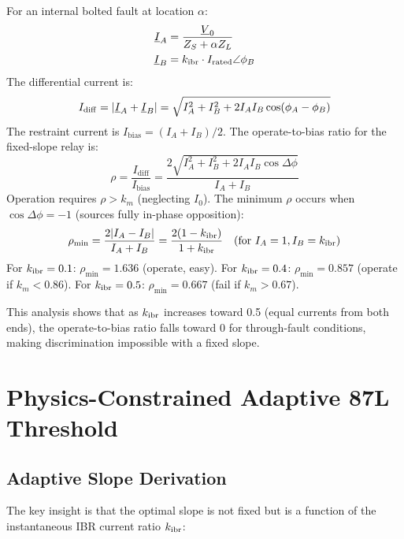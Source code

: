 For an internal bolted fault at location $\alpha$:
\begin{align}
  \underline{I}_A &= \frac{\underline{V}_0}{Z_S + \alpha Z_L}
  \label{eq:ch4_ia_fault} \\
  \underline{I}_B &= k_\mathrm{ibr} \cdot I_\mathrm{rated} \angle \phi_B
  \label{eq:ch4_ib_ibr}
\end{align}
The differential current is:
\begin{equation}
  I_\mathrm{diff} = |\underline{I}_A + \underline{I}_B|
    = \sqrt{I_A^2 + I_B^2 + 2I_A I_B \cos(\phi_A - \phi_B)}
  \label{eq:ch4_idiff_fault}
\end{equation}
The restraint current is $I_\mathrm{bias} = (I_A + I_B)/2$.
The operate-to-bias ratio for the fixed-slope relay is:
\begin{equation}
  \rho = \frac{I_\mathrm{diff}}{I_\mathrm{bias}} =
  \frac{2\sqrt{I_A^2 + I_B^2 + 2I_A I_B \cos\Delta\phi}}{I_A + I_B}
  \label{eq:ch4_rho}
\end{equation}
Operation requires $\rho > k_m$ (neglecting $I_0$). The minimum $\rho$
occurs when $\cos\Delta\phi = -1$ (sources fully in-phase opposition):
\begin{equation}
  \rho_\mathrm{min} = \frac{2|I_A - I_B|}{I_A + I_B}
  = \frac{2(1 - k_\mathrm{ibr})}{1 + k_\mathrm{ibr}} \quad (\text{for }I_A = 1, I_B = k_\mathrm{ibr})
  \label{eq:ch4_rho_min}
\end{equation}
For $k_\mathrm{ibr} = 0.1$: $\rho_\mathrm{min} = 1.636$ (operate, easy).
For $k_\mathrm{ibr} = 0.4$: $\rho_\mathrm{min} = 0.857$ (operate if $k_m < 0.86$).
For $k_\mathrm{ibr} = 0.5$: $\rho_\mathrm{min} = 0.667$ (fail if $k_m > 0.67$).

This analysis shows that as $k_\mathrm{ibr}$ increases toward 0.5 (equal currents
from both ends), the operate-to-bias ratio falls toward 0 for through-fault
conditions, making discrimination impossible with a fixed slope.

\section{Physics-Constrained Adaptive 87L Threshold}
\label{sec:ch4_adaptive}

\subsection{Adaptive Slope Derivation}

The key insight is that the optimal slope is not fixed but is a function
of the instantaneous IBR current ratio $k_\mathrm{ibr}$:


